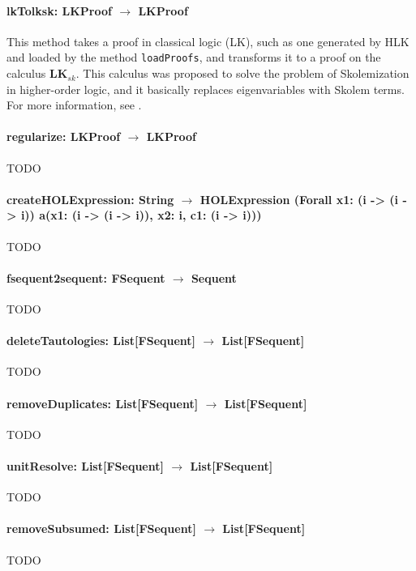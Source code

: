 \documentclass[a4paper, 11pt]{report}
\begin{document}
\paragraph{\textbf{lkTolksk: LKProof $\rightarrow$ LKProof}}
This method takes a proof in classical logic (LK), such as one generated by HLK and 
loaded by the method \texttt{loadProofs}, and transforms it to a proof on the
calculus $\mathbf{LK}_{sk}$. This calculus was proposed to solve the problem of
Skolemization in higher-order logic, and it basically replaces eigenvariables
with Skolem terms. For more information, see \cite{Hetzl2011}.

\paragraph{\textbf{regularize: LKProof $\rightarrow$ LKProof}}
{\color{red}TODO}

\paragraph{\textbf{createHOLExpression: String $\rightarrow$ HOLExpression
(Forall x1: (i -> (i -> i)) a(x1: (i -> (i -> i)), x2: i, c1: (i -> i)))}}
{\color{red}TODO}

\paragraph{\textbf{fsequent2sequent: FSequent $\rightarrow$ Sequent}}
{\color{red}TODO}

\paragraph{\textbf{deleteTautologies: List[FSequent] $\rightarrow$ List[FSequent]}}
{\color{red}TODO}

\paragraph{\textbf{removeDuplicates: List[FSequent] $\rightarrow$ List[FSequent]}}
{\color{red}TODO}

\paragraph{\textbf{unitResolve: List[FSequent] $\rightarrow$ List[FSequent]}}
{\color{red}TODO}

\paragraph{\textbf{removeSubsumed: List[FSequent] $\rightarrow$ List[FSequent]}}
{\color{red}TODO}
\end{document}
